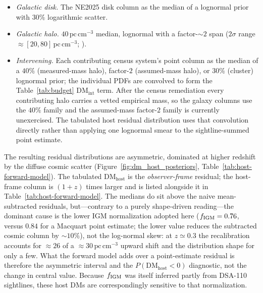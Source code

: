 \begin{itemize}
tabulated log-median increments to $1.5\%$ over $0.1<z<0.3$.
Holding $\sigma$ fixed below the grid, if anything, \emph{under}-represents the
diffuse scatter at $z<0.1$, where cosmic variance grows; this narrows
$P(\mathrm{DM_{host}})$ only slightly because the low-$z$ IGM column is small
($\lesssim35\,\mathrm{pc\,cm^{-3}}$).
The $f_{\rm IGM}$ mixture is evaluated by 64-node Gauss--Legendre quadrature
on each smooth side of the asymmetric prior, including analytically the
probability clipped onto the physical endpoints.
\item \emph{Galactic disk.} The NE2025 disk column as the median of a
lognormal prior with $30\%$ logarithmic scatter.
\item \emph{Galactic halo.} $40\,\mathrm{pc\,cm^{-3}}$ median, lognormal with a
factor-$\sim\!2$ span ($2\sigma$ range $\approx[20,80]\,\mathrm{pc\,cm^{-3}}$;
\citealt{YamasakiTotani2020, KeatingPen2020, Cook2023}).
\item \emph{Intervening.} Each contributing census system's point column
as the median of a $40\%$ (measured-mass halo), factor-$2$ (assumed-mass halo),
or $30\%$ (cluster) lognormal prior; the individual PDFs are convolved to form
the Table~\ref{tab:budget} $\mathrm{DM_{int}}$ term. After the census remediation every contributing halo
carries a vetted empirical mass, so the galaxy columns use the $40\%$ family
and the assumed-mass factor-$2$ family is currently unexercised. The tabulated
host residual distribution uses that convolution directly rather than applying one
lognormal smear to the sightline-summed point estimate.
\end{itemize}
The resulting residual distributions are asymmetric, dominated at higher redshift by the
diffuse cosmic scatter (Figure~\ref{fig:dm_host_posteriors},
Table~\ref{tab:host-forward-model}). The tabulated $\mathrm{DM_{host}}$ is the
\emph{observer-frame} residual; the host-frame column is $(1+z)$ times larger and
is listed alongside it in Table~\ref{tab:host-forward-model}. The medians do sit
above the naive mean-subtracted residuals, but---contrary to a purely
shape-driven reading---the dominant cause is the lower IGM normalization adopted
here ($f_{\rm IGM}=0.76$, versus $0.84$ for a Macquart point estimate; the
lower value reduces the subtracted cosmic column by $\sim\!10\%$), not
the log-normal skew: at $z\simeq0.3$ the recalibration accounts for $\approx26$
of a $\approx30\,\mathrm{pc\,cm^{-3}}$ upward shift and the distribution shape for
only a few. What the forward model adds over a point-estimate residual is
therefore the
asymmetric interval and the $P(\mathrm{DM_{host}}<0)$ diagnostic, not the change
in central value. Because $f_{\rm IGM}$ was itself inferred partly from DSA-110
sightlines, these host DMs are correspondingly sensitive to that normalization.

